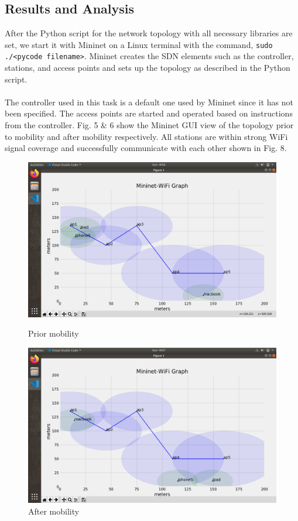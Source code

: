 \documentclass{article}
\begin{document}
\subsection{Results and Analysis}
After the Python script for the network topology with all necessary libraries are set, we start it with Mininet on a Linux terminal with the command, \texttt{sudo ./<pycode filename>}. Mininet creates the SDN elements such as the controller, stations, and access points and sets up the topology as described in the Python script. \\\\ The controller used in this task is a default one used by Mininet since it has not been specified. The access points are started and operated based on instructions from the controller. Fig. 5 \& 6 show the Mininet GUI view of the topology prior to mobility and after mobility respectively. All stations are within strong WiFi signal coverage and successfully communicate with each other shown in Fig. 8.
	\begin{figure}[h]
			\centering
        			\includegraphics[width=0.9\linewidth]{beforeMobility.png}
        			\caption{Prior mobility}
       			\label{fig:t1-3}
        		\endminipage
			\centering
        			\includegraphics[width=0.9\linewidth]{afterMobility.png}
        			\caption{After mobility}
        			\label{fig:t1-4}
        		\endminipage
	\end{figure}
\end{document}
